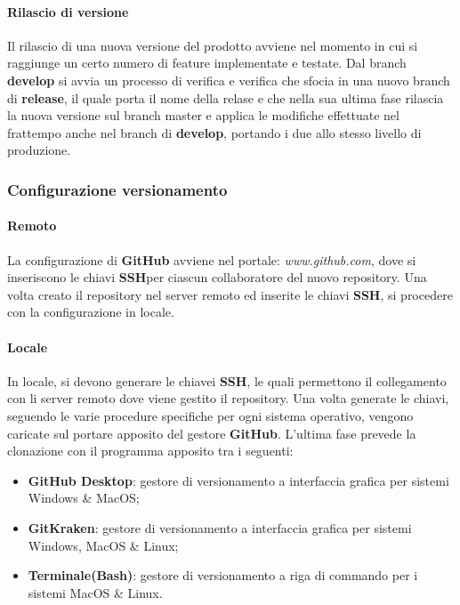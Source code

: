 \paragraph{Rilascio di versione}
Il rilascio di una nuova versione del prodotto avviene nel momento in cui si raggiunge un certo numero di feature implementate e testate. 
Dal branch \textbf{develop} si avvia un processo di verifica e verifica che sfocia in una nuovo branch di \textbf{release}, il quale porta il nome della relase e che nella sua ultima fase 
rilascia la nuova versione sul branch master e applica le modifiche effettuate nel frattempo anche nel branch di \textbf{develop}, portando i due allo stesso livello di produzione. 

\subsubsection{Configurazione versionamento}

\paragraph{Remoto}
	La configurazione di \textbf{GitHub} avviene nel portale: \textit{www.github.com}, dove si inseriscono le chiavi \textbf{SSH}\glossario per ciascun collaboratore del nuovo repository. 
	Una volta creato il repository nel server remoto ed inserite le chiavi \textbf{SSH}, si procedere con la configurazione in locale.
	
\paragraph{Locale}
	In locale, si devono generare le chiavei \textbf{SSH}, le quali permettono il collegamento con li server remoto dove viene gestito il repository. 
	Una volta generate le chiavi, seguendo le varie procedure specifiche per ogni sistema operativo, vengono caricate sul portare apposito del gestore \textbf{GitHub}.
	L'ultima fase prevede la clonazione con il programma apposito tra i seguenti: 

	\begin{itemize}
		\item \textbf{GitHub Desktop}: gestore di versionamento a interfaccia grafica per sistemi Windows \& MacOS; 
		\item \textbf{GitKraken}: gestore di versionamento a interfaccia grafica per sistemi Windows, MacOS \& Linux; 		
		\item \textbf{Terminale(Bash)}: gestore di versionamento a riga di commando per i sistemi MacOS \& Linux.
	\end{itemize}
		
